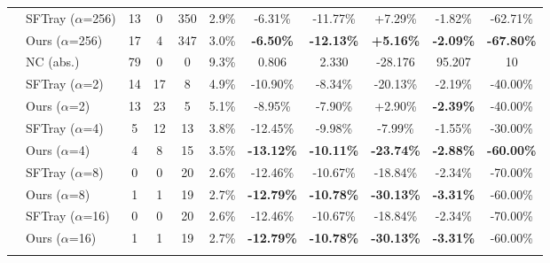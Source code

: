 \begin{table}[t]
{\begin{tabular}{ll|cccc|ccc|cc}
\addlinespace[0.3em]

 & SFTray ($\alpha$=256) & 13 & 0 & 350 & 2.9\% & -6.31\% & -11.77\% & +7.29\% & -1.82\% & -62.71\% \\

 & Ours ($\alpha$=256) & 17 & 4 & 347 & 3.0\% & \textbf{-6.50\%} & \textbf{-12.13\%} & \textbf{+5.16\%} & \textbf{-2.09\%} & \textbf{-67.80\%} \\

\addlinespace[0.3em]

\midrule

\multirow{17}{*}{uart} & NC (abs.) & 79 & 0 & 0 & 9.3\% & 0.806 & 2.330 & -28.176 & 95.207 & 10 \\

\addlinespace[0.4em]

 & SFTray ($\alpha$=2) & 14 & 17 & 8 & 4.9\% & -10.90\% & -8.34\% & -20.13\% & -2.19\% & -40.00\% \\

 & Ours ($\alpha$=2) & 13 & 23 & 5 & 5.1\% & -8.95\% & -7.90\% & +2.90\% & \textbf{-2.39\%} & -40.00\% \\

\addlinespace[0.3em]

 & SFTray ($\alpha$=4) & 5 & 12 & 13 & 3.8\% & -12.45\% & -9.98\% & -7.99\% & -1.55\% & -30.00\% \\

 & Ours ($\alpha$=4) & 4 & 8 & 15 & 3.5\% & \textbf{-13.12\%} & \textbf{-10.11\%} & \textbf{-23.74\%} & \textbf{-2.88\%} & \textbf{-60.00\%} \\

\addlinespace[0.3em]

 & SFTray ($\alpha$=8) & 0 & 0 & 20 & 2.6\% & -12.46\% & -10.67\% & -18.84\% & -2.34\% & -70.00\% \\

 & Ours ($\alpha$=8) & 1 & 1 & 19 & 2.7\% & \textbf{-12.79\%} & \textbf{-10.78\%} & \textbf{-30.13\%} & \textbf{-3.31\%} & -60.00\% \\

\addlinespace[0.3em]

 & SFTray ($\alpha$=16) & 0 & 0 & 20 & 2.6\% & -12.46\% & -10.67\% & -18.84\% & -2.34\% & -70.00\% \\

 & Ours ($\alpha$=16) & 1 & 1 & 19 & 2.7\% & \textbf{-12.79\%} & \textbf{-10.78\%} & \textbf{-30.13\%} & \textbf{-3.31\%} & -60.00\% \\

\addlinespace[0.3em]


\end{tabular}}
\end{table}
